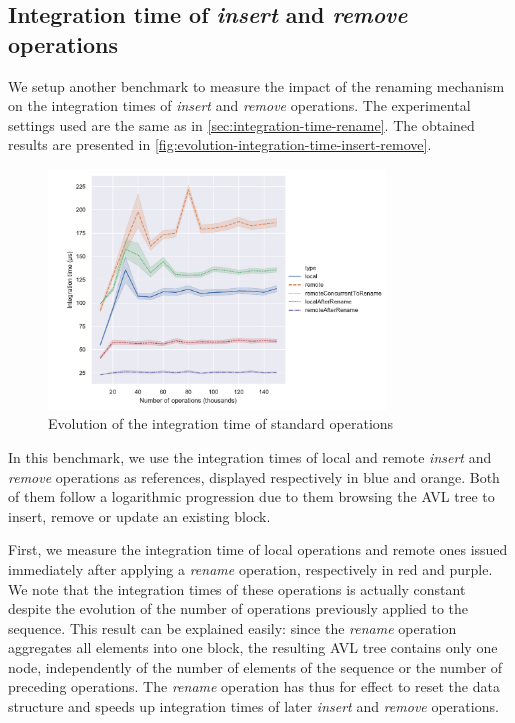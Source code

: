 \documentclass{article}
\theoremstyle{definition}
\begin{document}
\subsection{Integration time of \emph{insert} and \emph{remove} operations}


We setup another benchmark to measure the impact of the renaming mechanism on the integration times of \emph{insert} and \emph{remove} operations.
The experimental settings used are the same as in \autoref{sec:integration-time-rename}.
The obtained results are presented in \autoref{fig:evolution-integration-time-insert-remove}.

\begin{figure}
    \centering
    \includegraphics[width=0.8\textwidth]{img/integration-time-9.pdf}
    \caption{Evolution of the integration time of standard operations}
    \label{fig:evolution-integration-time-insert-remove}
\end{figure}

In this benchmark, we use the integration times of local and remote \emph{insert} and \emph{remove} operations as references, displayed respectively in blue and orange.
Both of them follow a logarithmic progression due to them browsing the AVL tree to insert, remove or update an existing block.

First, we measure the integration time of local operations and remote ones issued immediately after applying a \emph{rename} operation, respectively in red and purple.
We note that the integration times of these operations is actually constant despite the evolution of the number of operations previously applied to the sequence.
This result can be explained easily: since the \emph{rename} operation aggregates all elements into one block, the resulting AVL tree contains only one node, independently of the number of elements of the sequence or the number of preceding operations.
The \emph{rename} operation has thus for effect to reset the data structure and speeds up integration times of later \emph{insert} and \emph{remove} operations.
\end{document}
